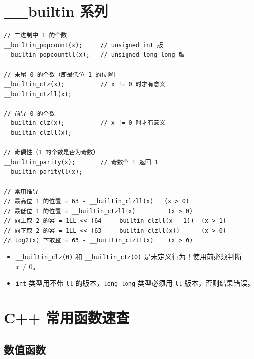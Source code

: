 \documentclass[UTF8,openany,oneside,zihao=-4]{ctexbook}
\begin{document}
\section{\_\_builtin 系列}

\begin{lstlisting}
// 二进制中 1 的个数
__builtin_popcount(x);     // unsigned int 版
__builtin_popcountll(x);   // unsigned long long 版

// 末尾 0 的个数（即最低位 1 的位置）
__builtin_ctz(x);          // x != 0 时才有意义
__builtin_ctzll(x);

// 前导 0 的个数
__builtin_clz(x);          // x != 0 时才有意义
__builtin_clzll(x);

// 奇偶性（1 的个数是否为奇数）
__builtin_parity(x);       // 奇数个 1 返回 1
__builtin_parityll(x);

// 常用推导
// 最高位 1 的位置 = 63 - __builtin_clzll(x)   (x > 0)
// 最低位 1 的位置 = __builtin_ctzll(x)         (x > 0)
// 向上取 2 的幂 = 1LL << (64 - __builtin_clzll(x - 1))  (x > 1)
// 向下取 2 的幂 = 1LL << (63 - __builtin_clzll(x))      (x > 0)
// log2(x) 下取整 = 63 - __builtin_clzll(x)    (x > 0)
\end{lstlisting}

\begin{warn}
\begin{itemize}
  \item \lstinline|__builtin_clz(0)| 和 \lstinline|__builtin_ctz(0)| 是未定义行为！使用前必须判断 $x \neq 0$。
  \item \lstinline|int| 类型用不带 \lstinline|ll| 的版本，\lstinline|long long| 类型必须用 \lstinline|ll| 版本，否则结果错误。
\end{itemize}
\end{warn}

\section{C++ 常用函数速查}

\subsection{数值函数}
\end{document}
